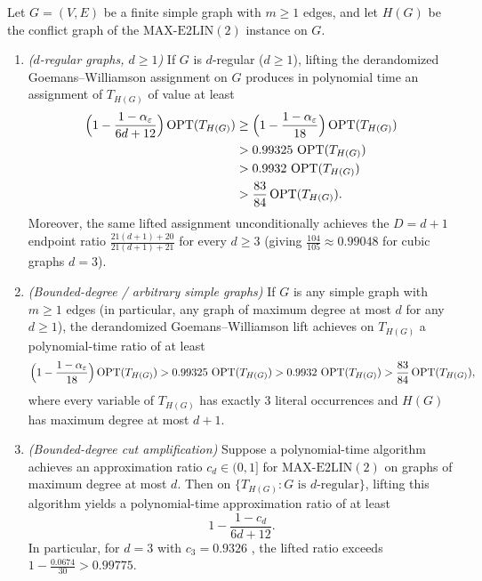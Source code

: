 \documentclass[preprints,article,accept,oneauthor,pdftex]{Definitions/mdpi}
\begin{document}
\begin{Theorem}\label{thm:general-e2lin}
Let $G=(V,E)$ be a finite simple graph with $m \ge 1$ edges, and let $H(G)$ be the conflict graph of the $\mathrm{MAX\text{-}E2LIN}(2)$ instance on $G$.
\begin{enumerate}
\item \emph{($d$-regular graphs, $d \ge 1$)} If $G$ is $d$-regular ($d \ge 1$), lifting the derandomized Goemans--Williamson assignment on $G$ produces in polynomial time an assignment of $T_{H(G)}$ of value at least
\begin{align*}
\Bigl(1 - \frac{1-\alpha_\varepsilon}{6d+12}\Bigr)\operatorname{OPT}(T_{H(G)}) &\ge \Bigl(1 - \frac{1-\alpha_\varepsilon}{18}\Bigr)\operatorname{OPT}(T_{H(G)}) \\
&> 0.99325\,\operatorname{OPT}(T_{H(G)}) \\
&> 0.9932\,\operatorname{OPT}(T_{H(G)}) \\
&> \frac{83}{84}\operatorname{OPT}(T_{H(G)}).
\end{align*}
Moreover, the same lifted assignment unconditionally achieves the $D=d+1$ endpoint ratio $\frac{21(d+1)+20}{21(d+1)+21}$ for every $d \ge 3$ (giving $\frac{104}{105} \approx 0.99048$ for cubic graphs $d=3$).
\item \emph{(Bounded-degree / arbitrary simple graphs)} If $G$ is any simple graph with $m \ge 1$ edges (in particular, any graph of maximum degree at most $d$ for any $d \ge 1$), the derandomized Goemans--Williamson lift achieves on $T_{H(G)}$ a polynomial-time ratio of at least
\[
\Bigl(1 - \frac{1-\alpha_\varepsilon}{18}\Bigr)\operatorname{OPT}(T_{H(G)}) > 0.99325\,\operatorname{OPT}(T_{H(G)}) > 0.9932\,\operatorname{OPT}(T_{H(G)}) > \frac{83}{84}\operatorname{OPT}(T_{H(G)}),
\]
where every variable of $T_{H(G)}$ has exactly $3$ literal occurrences and $H(G)$ has maximum degree at most $d+1$.
\item \emph{(Bounded-degree cut amplification)} Suppose a polynomial-time algorithm achieves an approximation ratio $c_d \in (0,1]$ for $\mathrm{MAX\text{-}E2LIN}(2)$ on graphs of maximum degree at most $d$. Then on $\{T_{H(G)} : G \text{ is } d\text{-regular}\}$, lifting this algorithm yields a polynomial-time approximation ratio of at least
\[
1 - \frac{1-c_d}{6d+12}.
\]
In particular, for $d=3$ with $c_3 = 0.9326$ \cite{HalperinLivnatZwick2004}, the lifted ratio exceeds $1 - \frac{0.0674}{30} > 0.99775$.
\end{enumerate}
\end{Theorem}
\end{document}
